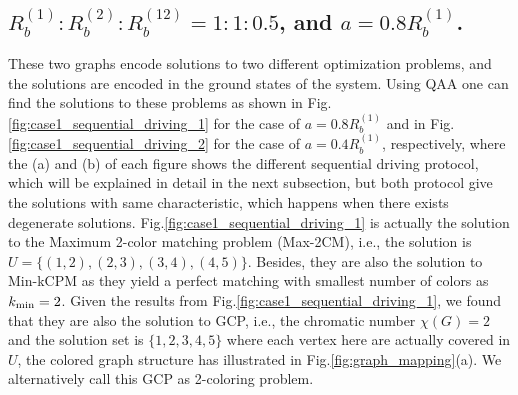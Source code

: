 \documentclass[%
 reprint,
nofootinbib,
 amsmath,amssymb,
 aps,
pra,
floatfix,
]{revtex4-2}
\begin{document}
\subsection{$R^{(1)}_b:R^{(2)}_b:R^{(12)}_b=1:1:0.5$, {\rm and} $a=0.8R^{(1)}_b$.}
These two graphs encode solutions to two different optimization problems, and the solutions are encoded in the ground states of the system. Using QAA one can find the solutions to these problems as shown in Fig.\ref{fig:case1_sequential_driving_1} for the case of $a=0.8R^{(1)}_b$ and in Fig.\ref{fig:case1_sequential_driving_2} for the case of $a=0.4R^{(1)}_b$, respectively, where the (a) and (b) of each figure shows the different sequential driving protocol, which will be explained in detail in the next subsection, but both protocol give the solutions with same characteristic, which happens when there exists degenerate solutions. Fig.\ref{fig:case1_sequential_driving_1} is actually the solution to the Maximum 2-color matching problem (Max-2CM), i.e., the solution is $U=\{(1,2),(2,3),(3,4),(4,5)\}$. Besides, they are also the solution to Min-kCPM as they yield a perfect matching with smallest number of colors as $k_{\rm min} = 2$. Given the results from Fig.\ref{fig:case1_sequential_driving_1}, we found that they are also the solution to GCP, i.e., the chromatic number $\chi(G)=2$ and the solution set is $\{1,2,3,4,5\}$ where each vertex here are actually covered in $U$, the colored graph structure has illustrated in Fig.\ref{fig:graph_mapping}(a). We alternatively call this GCP as 2-coloring problem.  
\end{document}

